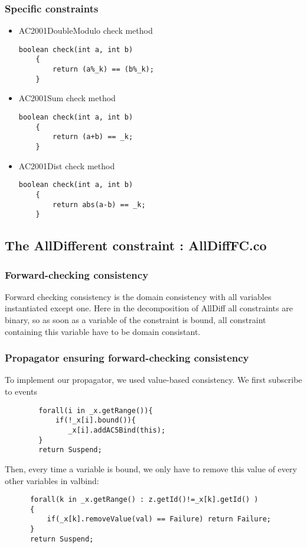 \documentclass{eplDoc}
\begin{document}
\subsubsection{Specific constraints}
\begin{itemize}
\item AC2001DoubleModulo check method  

\begin{lstlisting}
boolean check(int a, int b)
    {
        return (a%_k) == (b%_k);
    }
\end{lstlisting}

\item AC2001Sum check method  

\begin{lstlisting}
boolean check(int a, int b)
    {
        return (a+b) == _k;
    }
  \end{lstlisting}
  
\item AC2001Dist check method 

\begin{lstlisting}
boolean check(int a, int b)
    { 
        return abs(a-b) == _k;
    }
    \end{lstlisting}
\end{itemize}
\subsection{The AllDifferent constraint : AllDiffFC.co} %

\subsubsection{Forward-checking consistency}
Forward checking consistency is the domain consistency with all variables instantiated except one.  Here in the decomposition of AllDiff all constraints are binary, so as soon as a variable of the constraint is bound, all constraint containing this variable have to be domain consistant.

\subsubsection{Propagator ensuring forward-checking consistency}
To implement our propagator, we used value-based consistency. We first subscribe to events
\begin{lstlisting}
        forall(i in _x.getRange()){
            if(!_x[i].bound()){
               _x[i].addAC5Bind(this);
        }
        return Suspend;
\end{lstlisting}
Then, every time a variable is bound, we only have to remove this value of every other variables in valbind:
 \begin{lstlisting}
      forall(k in _x.getRange() : z.getId()!=_x[k].getId() )
      {
          if(_x[k].removeValue(val) == Failure) return Failure;
      }
      return Suspend;
     
 \end{lstlisting}
\end{document}
